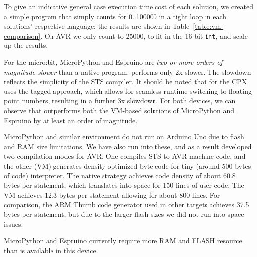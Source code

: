 To give an indicative general case execution time cost of each solution, we created a simple program that simply 
counts for 0..100000 in a tight loop in each solutions' respective language; 
the results are shown in Table~\ref{table:vm-comparison}. 
On AVR we only count to 25000, to fit in the 16 bit \texttt{int}, and scale up the results.

For the micro:bit, MicroPython and Espruino are \emph{two or more orders of magnitude slower} than a native \CO program. 
\MC performs only 2x slower. The slowdown reflects the simplicity of the STS compiler.
It should be noted that \MC for the CPX uses the tagged approach, which allows for seamless runtime switching to floating point numbers,
resulting in a further 3x slowdown. For both devices, we can observe that \MC outperforms both the VM-based solutions of MicroPython and 
Espruino by at least an order of magnitude. 

MicroPython and similar environment do not run on Arduino Uno due to flash and RAM size limitations.
We have also run into these, and as a result developed two compilation modes for AVR.
One compiles STS to AVR machine code, and the other (\MC VM) generates density-optimized byte code for 
tiny (around 500 bytes of code) interpreter.
The native strategy achieves code density of about 60.8 bytes per statement,
which translates into space for 150 lines of user code.
The VM achieves 12.3 bytes per statement allowing for about 800 lines.
For comparison, the ARM Thumb code generator used in other targets achieves
37.5 bytes per statement, but due to the larger flash sizes we did not run
into space issues.


MicroPython and Espruino currently require more RAM and FLASH resource than is available in this device.

